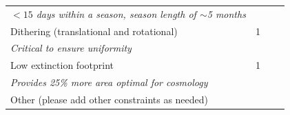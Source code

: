 \documentclass[12pt, letterpaper]{article}
\begin{document}
\begin{minipage}{\columnwidth}
\begin{tabular}{l|l|l|l}
        \hspace{20pt} \emph{$<15$ days within a season, season length of $\sim$5 months} &\\
        Dithering (translational and rotational) & 1\\
        \hspace{20pt} \emph{Critical to ensure uniformity} &\\
        Low extinction footprint & 1\\
        \hspace{20pt} \emph{Provides 25\% more area optimal for cosmology} &\\
        Other (please add other constraints as needed) & \\
        \bottomrule
    \end{tabular}
        \label{tab:obs_constraints}
\end{minipage}
\end{document}

